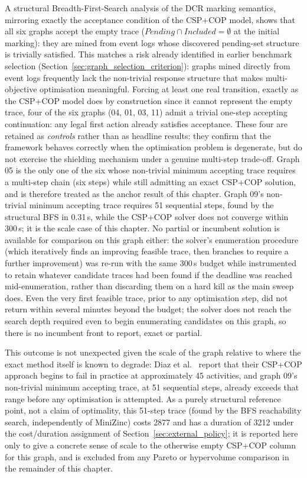 A structural Breadth-First-Search analysis of the \ac{DCR} marking
semantics, mirroring exactly the acceptance condition of the CSP+COP
model, shows that all six graphs accept the empty trace
($\mathit{Pending} \cap \mathit{Included} = \emptyset$ at the initial
marking): they are mined from event logs whose discovered pending-set
structure is trivially satisfied. This matches a risk already
identified in earlier benchmark selection
(Section~\ref{sec:graph_selection_criterion}): graphs mined directly
from event logs frequently lack the non-trivial response structure
that makes multi-objective optimisation meaningful. Forcing at least
one real transition, exactly as the CSP+COP model does by construction
since it cannot represent the empty trace, four of the six graphs (04,
01, 03, 11) admit a trivial one-step accepting continuation: any
legal first action already satisfies acceptance. These four are
retained as \emph{controls} rather than as headline results: they
confirm that the framework behaves correctly when the optimisation
problem is degenerate, but do not exercise the shielding mechanism
under a genuine multi-step trade-off. Graph 05 is the only one of the
six whose non-trivial minimum accepting trace requires a multi-step
chain (six steps) while still admitting an exact CSP+COP solution, and
is therefore treated as the anchor result of this chapter. Graph 09's
non-trivial minimum accepting trace requires 51 sequential steps,
found by the structural BFS in 0.31\,s, while the CSP+COP solver does
not converge within 300\,s; it is the scale case of this chapter. No
partial or incumbent solution is available for comparison on this
graph either: the solver's enumeration procedure (which iteratively
finds an improving feasible trace, then branches to require a further
improvement) was re-run with the same 300\,s budget while instrumented
to retain whatever candidate traces had been found if the deadline was
reached mid-enumeration, rather than discarding them on a hard kill as
the main sweep does. Even the very first feasible trace, prior to any
optimisation step, did not return within several minutes beyond the
budget; the solver does not reach the search depth required even to
begin enumerating candidates on this graph, so there is no incumbent
front to report, exact or partial.

This outcome is not unexpected given the scale of the graph relative to
where the exact method itself is known to degrade: Diaz et
al.~\cite{Diaz2024Pareto-OptimalModels} report that their CSP+COP
approach begins to fail in practice at approximately 45 activities,
and graph 09's non-trivial minimum accepting trace, at 51 sequential
steps, already exceeds that range before any optimisation is
attempted. As a purely structural reference point, not a claim of
optimality, this 51-step trace (found by the BFS reachability search,
independently of MiniZinc) costs 2877 and has a duration of 3212 under
the cost/duration assignment of
Section~\ref{sec:external_policy}; it is reported here only
to give a concrete sense of scale to the otherwise empty CSP+COP
column for this graph, and is excluded from any Pareto or hypervolume
comparison in the remainder of this chapter.

